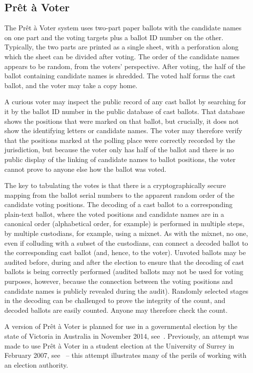 \subsection{Prêt à Voter~\cite{chaum2005}}

The Prêt à Voter system uses two-part paper ballots with the candidate names
on one part and the voting targets plus a ballot ID number on the other.
Typically, the two parts are printed as a single sheet, with a perforation
along which the sheet can be divided after voting.  The order of the
candidate names appears to be random, from the voters' perspective.  After
voting, the half of the ballot containing candidate names is shredded. The
voted half forms the cast ballot, and the voter may take a copy home.

A curious voter may inspect the public record of any cast ballot by
searching for it by the ballot ID number in the public database of cast
ballots.  That database shows the positions that were marked on that ballot,
but crucially, it does not show the identifying letters or candidate names.
The voter may therefore verify that the positions marked at the polling
place were correctly recorded by the jurisdiction, but because the voter
only has half of the ballot and there is no public display of the linking of
candidate names to ballot positions, the voter cannot prove to anyone else
how the ballot was voted.

The key to tabulating the votes is that there is a cryptographically secure
mapping from the ballot serial numbers to the apparent random order of the
candidate voting positions.  The decoding of a cast ballot to a
corresponding plain-text ballot, where the voted positions and candidate
names are in a canonical order (alphabetical order, for example) is
performed in multiple steps, by multiple custodians, for example, using a
mixnet. As with the mixnet, no one, even if colluding with a subset of the
custodians, can connect a decoded ballot to the corresponding cast ballot
(and, hence, to the voter).  Unvoted ballots may be audited before, during
and after the election to ensure that the decoding of cast ballots is being
correctly performed (audited ballots may not be used for voting purposes,
however, because the connection between the voting positions and candidate
names is publicly revealed during the audit). Randomly selected stages in
the decoding can be challenged to prove the integrity of the count, and
decoded ballots are easily counted.  Anyone may therefore check the count.

A version of Prêt à Voter is planned for use in a governmental election by
the state of Victoria in Australia in November 2014, see~\cite{burton2012}.
Previously, an attempt was made to use Prêt à Voter in a student election at
the University of Surrey in February 2007, see~\cite{bismark2007} -- this
attempt illustrates many of the perils of working with an election
authority.

